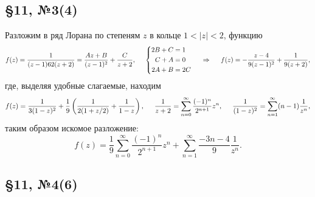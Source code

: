 \subsection*{\S11, №3(4)}

Разложим в ряд Лорана по степеням $z$ в кольце $1 < |z| < 2$, функцию
\begin{equation*}
    f(z) = \frac{1}{(z-1)62 (z+2)} = 
    \frac{Az + B}{(z-1)^2} + \frac{C}{z+2},
    \hspace{5 mm} 
    \left\{\begin{aligned}
        2 B + C &= 1 \\
        C + A &= 0 \\
        2 A + B &= 2C \\
    \end{aligned}\right.
    \hspace{0.5cm} \Rightarrow \hspace{0.5cm}
    f(z) = - \frac{z - 4}{9 (z-1)^2} + \frac{1}{9 (z+2)},
\end{equation*}
где, выделяя удобные слагаемые, находим
\begin{equation*}
    f(z) = \frac{1}{3(1-z)^2} + \frac{1}{9} \left(
        \frac{1}{2 (1 + z/2)} + \frac{1}{1-z}
    \right),
    \hspace{5 mm} 
    \frac{1}{z + 2} = \sum_{n=0}^{\infty} \frac{(-1)^n}{2^{n+1}} z^n,
    \hspace{5 mm} 
    \frac{1}{(1-z)^2} = \sum_{n=1}^{\infty} (n-1) \frac{1}{z^n},
\end{equation*}
таким образом искомое разложение:
\begin{equation*}
    f(z) = \frac{1}{9} \sum_{n=0}^{\infty} \frac{(-1)^n}{2^{n+1}} z^n + 
    \sum_{n=1}^{\infty} \frac{-3 n - 4}{9} \frac{1}{z^n}. 
\end{equation*}




\subsection*{\S11, №4(6)}

